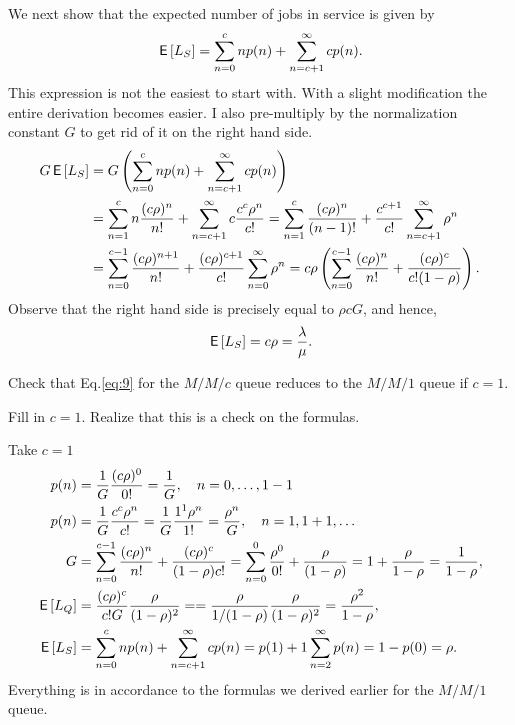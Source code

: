 \begin{exercise}
\begin{solution}
We next show that the expected number of jobs in service is given
by
    \begin{equation*}
      \,\mathsf{E}\left[L_S\right] = \sum_{n=0}^{c} n p(n) + \sum_{n=c+1}^{\infty} c p(n).
    \end{equation*}
    This expression is not the easiest to start with. With a slight
    modification the entire derivation becomes easier. I also pre-multiply by the normalization constant $G$ to get rid of it on the right hand side. 
    \begin{align*}
      G \,\mathsf{E}\left[L_S\right]
&= G \left( \sum_{n=0}^{c} n p(n) + \sum_{n=c+1}^{\infty} c p(n) \right) \\
&= \sum_{n=1}^{c} n \frac{(c\rho)^n}{n!}  + \sum_{n=c+1}^{\infty} c \frac{c^c\rho^n}{c!} 
= \sum_{n=1}^{c} \frac{(c\rho)^n}{(n-1)!}  + \frac{c^{c+1}}{c!}\sum_{n=c+1}^{\infty} \rho^n\\
&= \sum_{n=0}^{c-1} \frac{(c\rho)^{n+1}}{n!}  + \frac{(c\rho)^{c+1}}{c!}\sum_{n=0}^{\infty} \rho^n
= c\rho \left(\sum_{n=0}^{c-1} \frac{(c\rho)^n}{n!}  + \frac{(c\rho)^{c}}{c!(1-\rho)}\right).
    \end{align*}
Observe that the right hand side is precisely equal to $\rho c G$, and hence,
\begin{equation*}
  \,\mathsf{E}\left[L_S\right] = c\rho = \frac\lambda\mu.
\end{equation*}
\end{solution}
\end{exercise}

\begin{exercise}{\faFlask}
  Check that  Eq.\eqref{eq:9} for the $M/M/c$ queue reduces to the $M/M/1$ queue if $c=1$.
  \begin{hint}
Fill in $c=1$. Realize that this is a check on the formulas.
  \end{hint}
  \begin{solution}
Take $c=1$
\begin{subequations}
 \begin{align}
p(n) &= \frac{1}G \frac{(c\rho)^0}{0!}=\frac1 G, \quad n=0,\ldots, 1-1 \\
p(n) &= \frac{1}G \frac{c^c\rho^n}{c!} = \frac{1}G \frac{1^1\rho^n}{1!} =\frac{\rho^n}G , \quad n=1,1+1, \ldots \\
G &=\sum_{n=0}^{c-1} \frac{(c\rho)^n}{n!} + \frac{(c\rho)^c}{(1-\rho)c!}
=\sum_{n=0}^{0} \frac{\rho^0}{0!} + \frac{\rho}{(1-\rho)} = 1 + \frac{\rho}{1-\rho} = \frac1{1-\rho},
\\
\,\mathsf{E}\left[L_Q\right] &= \frac{(c\rho)^c}{c! G}\frac{\rho}{(1-\rho)^2} = 
= \frac{\rho}{1/(1-\rho)}\frac{\rho}{(1-\rho)^2} = \frac{\rho^2}{1-\rho}, \\
\,\mathsf{E}\left[L_S\right] &= \sum_{n=0}^{c}n p(n) + \sum_{n=c+1}^\infty c p(n) = p(1) + 1 \sum_{n=2}^\infty p(n) = 1- p(0) = \rho.
\end{align}
\end{subequations}
Everything is in accordance to the formulas we derived earlier for the $M/M/1$ queue.    
  \end{solution}
\end{exercise}



